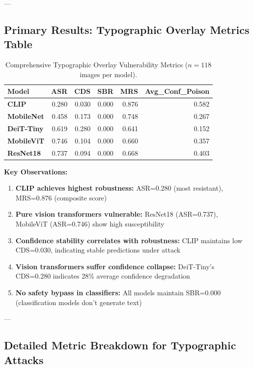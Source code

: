 \documentclass[11pt]{article}
\begin{document}
---

\subsection{Primary Results: Typographic Overlay Metrics Table}

\begin{table}[H]
\centering
\small
\caption{Comprehensive Typographic Overlay Vulnerability Metrics ($n=118$ images per model).}
\label{tab:typographic_metrics}
\begin{tabular}{|l|r|r|r|r|r|}
\hline
\textbf{Model} & \textbf{ASR} & \textbf{CDS} & \textbf{SBR} & \textbf{MRS} & \textbf{Avg\_Conf\_Poison} \\
\hline
\textbf{CLIP} & 0.280 & 0.030 & 0.000 & 0.876 & 0.582 \\
\hline
\textbf{MobileNet} & 0.458 & 0.173 & 0.000 & 0.748 & 0.267 \\
\hline
\textbf{DeiT-Tiny} & 0.619 & 0.280 & 0.000 & 0.641 & 0.152 \\
\hline
\textbf{MobileViT} & 0.746 & 0.104 & 0.000 & 0.660 & 0.357 \\
\hline
\textbf{ResNet18} & 0.737 & 0.094 & 0.000 & 0.668 & 0.403 \\
\hline
\end{tabular}
\end{table}

\textbf{Key Observations:}

\begin{enumerate}[leftmargin=2em]
    \item \textbf{CLIP achieves highest robustness:} ASR=0.280 (most resistant), MRS=0.876 (composite score)
    \item \textbf{Pure vision transformers vulnerable:} ResNet18 (ASR=0.737), MobileViT (ASR=0.746) show high susceptibility
    \item \textbf{Confidence stability correlates with robustness:} CLIP maintains low CDS=0.030, indicating stable predictions under attack
    \item \textbf{Vision transformers suffer confidence collapse:} DeiT-Tiny's CDS=0.280 indicates 28\% average confidence degradation
    \item \textbf{No safety bypass in classifiers:} All models maintain SBR=0.000 (classification models don't generate text)
\end{enumerate}

---

\subsection{Detailed Metric Breakdown for Typographic Attacks}
\end{document}
